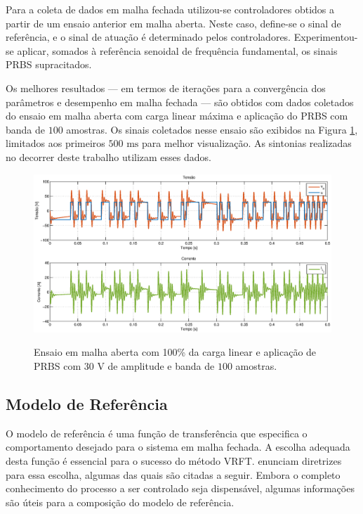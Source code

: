 \documentclass[repeatfields,oneside]{tcc}
\begin{document}
Para a coleta de dados em malha fechada utilizou-se controladores obtidos a partir de um ensaio anterior em malha aberta.
Neste caso, define-se o sinal de referência, e o sinal de atuação é determinado pelos controladores.
Experimentou-se aplicar, somados à referência senoidal de frequência fundamental, os sinais PRBS supracitados.

Os melhores resultados --- em termos de iterações para a convergência dos parâmetros e desempenho em malha fechada --- são obtidos com dados coletados do ensaio em malha aberta com carga linear máxima e aplicação do PRBS com banda de $100$ amostras.
Os sinais coletados nesse ensaio são exibidos na Figura \ref{fig:prbs100}, limitados aos primeiros $500 \text{ ms}$ para melhor visualização.
As sintonias realizadas no decorrer deste trabalho utilizam esses dados.


\begin{figure}[h]
    \centering
    \caption{Ensaio em malha aberta com 100\% da carga linear e aplicação de PRBS com $30 \text{ V}$ de amplitude e banda de $100$ amostras.}
    \includegraphics[trim={80 20 80 18}, clip, width=\linewidth]{fig/prbs100.eps}
    \\
    \label{fig:prbs100}
\end{figure}

\subsection{Modelo de Referência}

O modelo de referência é uma função de transferência que especifica o comportamento desejado para o sistema em malha fechada.
A escolha adequada desta função é essencial para o sucesso do método VRFT.
\textcite{Bazanella2011} enunciam diretrizes para essa escolha, algumas das quais são citadas a seguir.
Embora o completo conhecimento do processo a ser controlado seja dispensável, algumas informações são úteis para a composição do modelo de referência.
\end{document}
